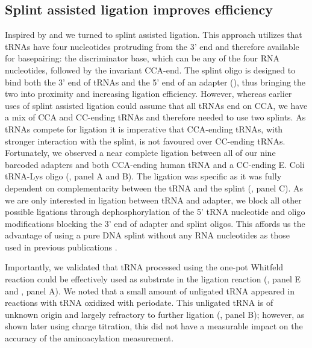 \documentclass[9pt,lineno]{elife}
\begin{document}
\subsection{Splint assisted ligation improves efficiency}
Inspired by \cite{Smith2015-ht} and \cite{Shigematsu2017-tv} we turned to splint assisted ligation.
This approach utilizes that tRNAs have four nucleotides protruding from the 3’ end and therefore available for basepairing: the discriminator base, which can be any of the four RNA nucleotides, followed by the invariant CCA-end.
The splint oligo is designed to bind both the 3’ end of tRNAs and the 5’ end of an adapter (), thus bringing the two into proximity and increasing ligation efficiency.
However, whereas earlier uses of splint assisted ligation could assume that all tRNAs end on CCA, we have a mix of CCA and CC-ending tRNAs and therefore needed to use two splints.
As tRNAs compete for ligation it is imperative that CCA-ending tRNAs, with stronger interaction with the splint, is not favoured over CC-ending tRNAs.
Fortunately, we observed a near complete ligation between all of our nine barcoded adapters and both CCA-ending human tRNA and a CC-ending E. Coli tRNA-Lys oligo (, panel A and B).
The ligation was specific as it was fully dependent on complementarity between the tRNA and the splint (, panel C).
As we are only interested in ligation between tRNA and adapter, we block all other possible ligations through dephosphorylation of the 5' tRNA nucleotide and oligo modifications blocking the 3’ end of adapter and splint oligos.
This affords us the advantage of using a pure DNA splint without any RNA nucleotides as those used in previous publications \citep{Smith2015-ht, Shigematsu2017-tv, Pinkard2020-yd, Warren2021-wt, Thomas2021-fi, Lucas2023-vm}.

Importantly, we validated that tRNA processed using the one-pot Whitfeld reaction could be effectively used as substrate in the ligation reaction (, panel E and , panel A).
We noted that a small amount of unligated tRNA appeared in reactions with tRNA oxidized with periodate.
This unligated tRNA is of unknown origin and largely refractory to further ligation (, panel B); however, as shown later using charge titration, this did not have a measurable impact on the accuracy of the aminoacylation measurement.
\end{document}

